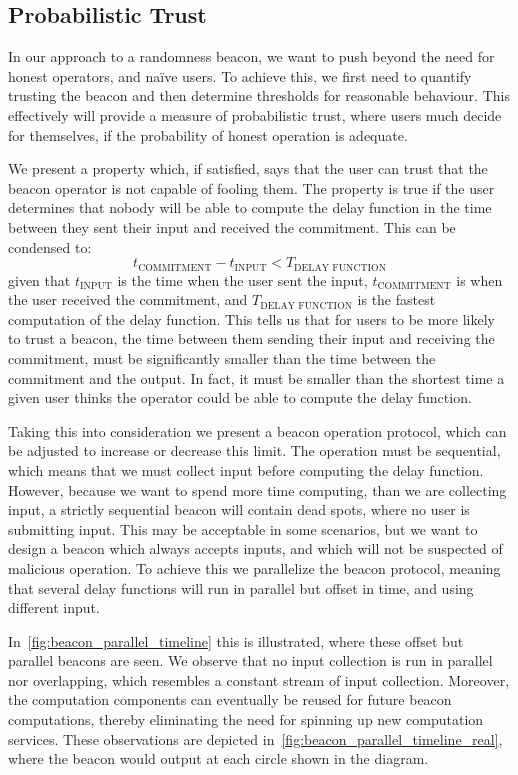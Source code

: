 \subsection{Probabilistic Trust}%
\label{sub:probabilistic_trust}
In our approach to a randomness beacon, we want to push beyond the need for honest operators, and naïve users.
To achieve this, we first need to quantify trusting the beacon and then determine thresholds for reasonable behaviour.
This effectively will provide a measure of probabilistic trust, where users much decide for themselves, if the probability of honest operation is adequate.

We present a property which, if satisfied, says that the user can trust that the beacon operator is not capable of fooling them.
The property is true if the user determines that nobody will be able to compute the delay function in the time between they sent their input and received the commitment.
This can be condensed to:
\begin{equation}
    t_\text{COMMITMENT} - t_\text{INPUT} < T_\text{DELAY FUNCTION}
\end{equation}
given that $t_\text{INPUT}$ is the time when the user sent the input, $t_\text{COMMITMENT}$ is when the user received the commitment, and $T_\text{DELAY FUNCTION}$ is the fastest computation of the delay function.
This tells us that for users to be more likely to trust a beacon, the time between them sending their input and receiving the commitment, must be significantly smaller than the time between the commitment and the output.
In fact, it must be smaller than the shortest time a given user thinks the operator could be able to compute the delay function.

Taking this into consideration we present a beacon operation protocol, which can be adjusted to increase or decrease this limit.
The operation must be sequential, which means that we must collect input before computing the delay function.
However, because we want to spend more time computing, than we are collecting input, a strictly sequential beacon will contain dead spots, where no user is submitting input.
This may be acceptable in some scenarios, but we want to design a beacon which always accepts inputs, and which will not be suspected of malicious operation.
To achieve this we parallelize the beacon protocol, meaning that several delay functions will run in parallel but offset in time, and using different input.

In~\cref{fig:beacon_parallel_timeline} this is illustrated, where these offset but parallel beacons are seen.
We observe that no input collection is run in parallel nor overlapping, which resembles a constant stream of input collection.
Moreover, the computation components can eventually be reused for future beacon computations, thereby eliminating the need for spinning up new computation services.
These observations are depicted in~\cref{fig:beacon_parallel_timeline_real}, where the beacon would output at each circle shown in the diagram.


